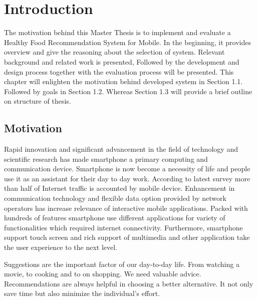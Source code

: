 \chapter{Introduction}
\setcounter{page}{1}%
\thispagestyle{empty}

The motivation behind this Master Thesis is to implement and evaluate a Healthy Food Recommendation System for Mobile. In the beginning, it provides overview and give the reasoning about the selection of system. Relevant background and related work is presented, Followed by the development and design process together with the evaluation process will be presented. \newline
This chapter will enlighten the motivation behind developed system in Section 1.1. Followed by goals in Section 1.2. Whereas Section 1.3 will provide a brief outline on structure of thesis.

\section{Motivation}\label{motivation}

Rapid innovation and significant advancement in the field of technology and scientific research has made smartphone a primary computing and communication device. Smartphone is now become a necessity of life and people use it as an assistant for their day to day work. According to latest survey more than half of Internet traffic is accounted by mobile device. Enhancement in communication technology and flexible data option provided by network operators has increase relevance of interactive mobile applications. Packed with hundreds of features smartphone use different applications for variety of functionalities which required internet connectivity. Furthermore, smartphone support touch screen and rich support of multimedia and other application take the user experience to the next level.\newline

Suggestions are the important factor of our day-to-day life. From watching a movie, to cooking and to on shopping. We need valuable advice. Recommendations are always helpful in choosing a better alternative. It not only save time but also minimize the individual's effort.\newline

